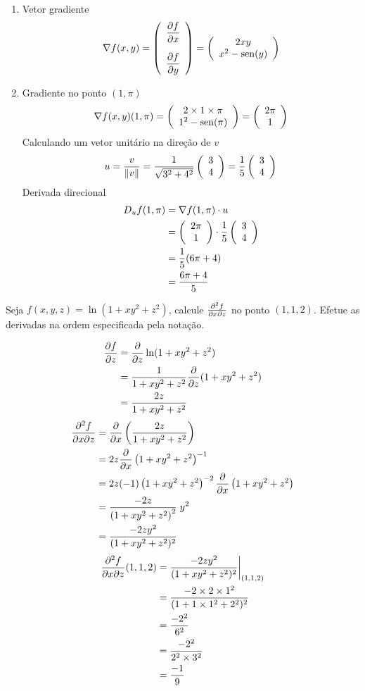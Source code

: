 \documentclass[a4paper,12pt,fleqn]{article}
\begin{document}
\begin{answer}
  \begin{enumerate}[label=\alph*)]
    \item
      Vetor gradiente
      \[
        \nabla f(x, y)
        = \Vetor{\D{f}{x}}{\D{f}{y}}
        = \vetor{2x y}{x^2 - \sin(y)}
      \]
    \item
      Gradiente no ponto $(1, \pi)$
      \[
        \nabla f(x, y) (1, \pi)
          = \left(\begin{array}{c} 2\times 1 \times\pi \\ 1^2 - \operatorname{sen}(\pi) \end{array}\right)
          = \left(\begin{array}{c} 2\pi \\ 1 \end{array}\right)
      \]
      Calculando um vetor unitário na direção de $v$
      \[
        u
        = \frac{v}{\norm{v}}
        = \frac{1}{\sqrt{3^2 + 4^2}} \vetor{3}{4}
        = \frac{1}{5} \vetor{3}{4}
      \]
      Derivada direcional
      \begin{align*}
        D_u f(1, \pi) & = \nabla f(1, \pi) \cdot u                       \\
                      & = \left(\begin{array}{c} 2\pi \\ 1 \end{array}\right) \cdot \frac{1}{5} \left(\begin{array}{c} 3 \\ 4 \end{array}\right) \\
                      & = \frac{1}{5} (6\pi + 4) \\
                      & = \frac{6\pi + 4}{5}
      \end{align*}
  \end{enumerate}
\end{answer}

Seja \( f(x, y, z) = \ln(1 + x y^2 + z^2) \),
calcule \(\frac{\partial^2 {f}}{\partial {x} \partial {z}} \) no ponto \( (1, 1, 2) \).
Efetue as derivadas na ordem especificada pela notação.
\clearpagequestiononly

\begin{answer}
\begin{align*}
  \frac{\partial {f}}{\partial {z}}
  & = \frac{\partial {}}{\partial {z}} \ln(1 + x y^2 + z^2) \\
  & = \frac{1}{1 + x y^2 + z^2} \frac{\partial {}}{\partial {z}}(1 + x y^2 + z^2) \\
  & = \frac{2z}{1 + x y^2 + z^2}
\end{align*}
\begin{align*}
  \frac{\partial^2 {f}}{\partial {x} \partial {z}}
  & = \frac{\partial {}}{\partial {x}}\left(\frac{2z}{1 + x y^2 + z^2}\right) \\
  & = 2z\frac{\partial {}}{\partial {x}}\left(1 + x y^2 + z^2\right)^{-1} \\
  & = 2z(-1)\left(1 + x y^2 + z^2\right)^{-2}\frac{\partial {}}{\partial {x}}\left(1 + x y^2 + z^2\right) \\
  & = \frac{-2z}{\left(1 + x y^2 + z^2\right)^2} \; y^2 \\
  & = \frac{-2z y^2}{(1 + x y^2 + z^2)^2}
\end{align*}
\begin{align*}
  \frac{\partial^2 {f}}{\partial {x} \partial {z}}(1, 1, 2)
  & = \frac{-2z y^2}{(1 + x y^2 + z^2)^2} \bigg\rvert_{(1, 1, 2)}^{} \\
  & = \frac{-2\times 2\times 1^2}{(1 + 1\times 1^2 + 2^2)^2}  \\
  & = \frac{-2^2}{6^2}  \\
  & = \frac{-2^2}{2^2\times 3^2}  \\
  & = \frac{-1}{9}
\end{align*}
\end{answer}

\end{document}
